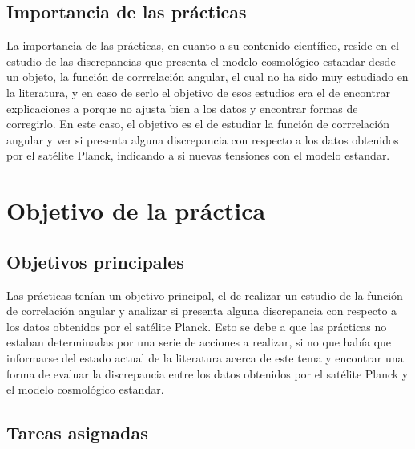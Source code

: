 \documentclass[12pt, a4paper]{article}
\theoremstyle{definition}
\begin{document}
\subsection{Importancia de las prácticas}

La importancia de las prácticas, en cuanto a su contenido científico, reside en el estudio de las discrepancias que presenta el modelo cosmológico estandar desde un objeto, la función de corrrelación angular, el cual no ha sido muy estudiado en la literatura, y en caso de serlo el objetivo de esos estudios era el de encontrar explicaciones a porque no ajusta bien a los datos y encontrar formas de corregirlo. En este caso, el objetivo es el de estudiar la función de corrrelación angular y ver si presenta alguna discrepancia con respecto a los datos obtenidos por el satélite Planck, indicando a si nuevas tensiones con el modelo estandar.


\section{Objetivo de la práctica}
\subsection{Objetivos principales}

Las prácticas tenían un objetivo principal, el de realizar un estudio de la función de correlación angular y analizar si presenta alguna discrepancia con respecto a los datos obtenidos por el satélite Planck. Esto se debe a que las prácticas no estaban determinadas por una serie de acciones a realizar, si no que había que informarse del estado actual de la literatura acerca de este tema y encontrar una forma de evaluar la discrepancia entre los datos obtenidos por el satélite Planck y el modelo cosmológico estandar.
\subsection{Tareas asignadas}
\end{document}
